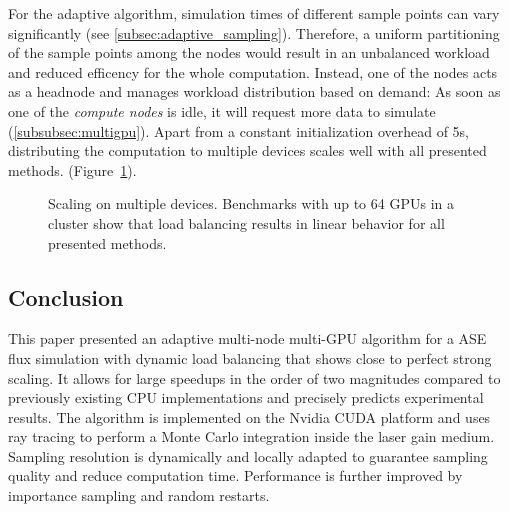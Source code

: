 For the adaptive algorithm, simulation times of different sample
points can vary significantly (see
\cref{subsec:adaptive_sampling}). Therefore, a uniform partitioning of
the sample points among the nodes would result in an unbalanced
workload and reduced efficency for the whole computation. Instead, one
of the nodes acts as a headnode and manages workload distribution
based on demand: As soon as one of the \emph{compute nodes} is idle,
it will request more data to simulate (\cref{subsubsec:multigpu}).
Apart from a constant initialization overhead of 5s, distributing the
computation to multiple devices scales well with all presented
methods. (Figure~\ref{plot:gpu_scaling}).
\begin{figure}[H]
  \centerline{
    }
  \caption{Scaling on multiple devices. Benchmarks with up to 64 GPUs
    in a cluster show that load balancing results in linear behavior for all
    presented methods.}
\label{plot:gpu_scaling}
\end{figure}

\subsection{Conclusion}
\label{subsec:conclusion}
This paper presented an adaptive multi-node multi-GPU algorithm for a
ASE flux simulation with dynamic load balancing that shows close to
perfect strong scaling. It allows for large speedups in the order of
two magnitudes compared to previously existing CPU implementations and
precisely predicts experimental results. The algorithm is implemented
on the Nvidia CUDA platform and uses ray tracing to perform a
Monte Carlo integration inside the laser gain medium. Sampling
resolution is dynamically and locally adapted to guarantee sampling
quality and reduce computation time. Performance is further improved
by importance sampling and random restarts.

